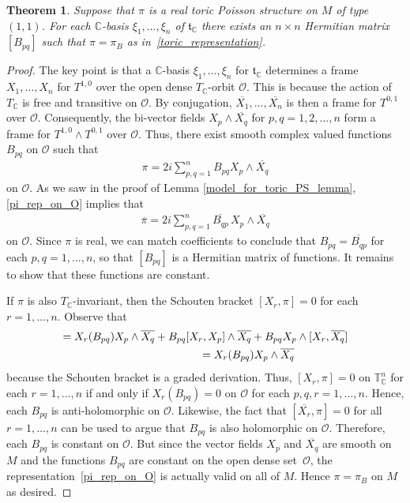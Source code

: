 \documentclass[pdftex]{sigma}
\numberwithin{equation}{section}
\newtheorem{Theorem}{Theorem}[section]
\begin{document}
\begin{Theorem}\label{invariant_nondegenerate_PS_on_tori}
Suppose that $\pi$ is a real toric Poisson structure on $M$ of type $(1,1)$. For each ${\mathbb C}$-basis $\xi_1,\dots,\xi_n$ of ${\mathfrak t}_{\mathbb C}$ there exists an $n\times n$ Hermitian matrix $[B_{pq}]$ such that $\pi=\pi_B$ as in~\eqref{toric_representation}.
\end{Theorem}
\begin{proof}
The key point is that a ${\mathbb C}$-basis $\xi_1,\dots,\xi_n$ for ${\mathfrak t}_{\mathbb C}$ determines a frame $X_1,\dots,X_n$ for $T^{1,0}$ over the open dense $T_{\mathbb C}$-orbit $\mathcal O$. This is because the action of $T_{\mathbb C}$ is free and transitive on $\mathcal O$. By conjugation, $\overline{X_1},\dots,\overline{X_n}$ is then a frame for $T^{0,1}$ over $\mathcal O$. Consequently, the bi-vector f\/ields $X_p\wedge\overline{X_q}$ for $p,q=1,2,\dots,n$ form a frame for $T^{1,0}\wedge T^{0,1}$ over $\mathcal O$. Thus, there exist smooth complex valued functions $B_{pq}$ on $\mathcal O$ such that
\begin{gather}\label{pi_rep_on_O}
\pi=2i\sum_{p,q=1}^n B_{pq}X_p\wedge \overline{X_q}
\end{gather}
on $\mathcal O$. As we saw in the proof of Lemma \ref{model_for_toric_PS_lemma}, \eqref{pi_rep_on_O} implies that
\begin{gather*}
\overline{\pi}=2i\sum_{p,q=1}^n \overline{B_{qp}}\,X_p\wedge \overline{X_q}
\end{gather*}
on $\mathcal O$. Since $\pi$ is real, we can match coef\/f\/icients to conclude that $B_{pq}=\overline{B_{qp}}$ for each $p,q=1,\dots,n$, so that $[B_{pq}]$ is a Hermitian matrix of functions. It remains to show that these functions are constant.

If $\pi$ is also $T_{\mathbb C}$-invariant, then the Schouten bracket $[X_r,\pi]=0$ for each $r=1,\dots,n$. Observe that
\begin{gather*}
[X_r,B_{pq}X_p\wedge \overline{X_q}]=X_r(B_{pq})X_p\wedge \overline{X_q}+B_{pq}[X_r,X_p]\wedge \overline{X_q} + B_{pq}X_p\wedge [X_r,\overline{X_q}] \\
\hphantom{[X_r,B_{pq}X_p\wedge \overline{X_q}]}{} =X_r(B_{pq})X_p\wedge \overline{X_q}
\end{gather*}
because the Schouten bracket is a graded derivation. Thus, $[X_r,\pi]=0$ on ${\mathbb T}_{\mathbb C}^n$ for each $r=1,\dots,n$ if and only if $X_r(B_{pq})=0$ on $\mathcal O$ for each $p,q,r=1,\dots,n$. Hence, each $B_{pq}$ is anti-holomorphic on $\mathcal O$. Likewise, the fact that $[\overline{X_r},\pi]=0$ for all $r=1,\dots,n$ can be used to argue that $B_{pq}$ is also holomorphic on $\mathcal O$. Therefore, each $B_{pq}$ is constant on $\mathcal O$. But since the vector f\/ields $X_p$ and $\overline{X_q}$ are smooth on $M$ and the functions $B_{pq}$ are constant on the open dense set~$\mathcal O$, the representation~\eqref{pi_rep_on_O} is actually valid on all of $M$. Hence $\pi=\pi_B$ on $M$ as desired.
\end{proof}
\end{document}

